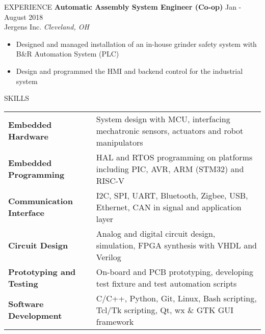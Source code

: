 \documentclass{lib/resume} %
\begin{document}
\begin{rSection}{EXPERIENCE}
    \textbf{Automatic Assembly System Engineer (Co-op)} \hfill Jan - August 2018
    \\	Jergens Inc. \hfill \textit{Cleveland, OH}
    \begin{itemize}
        \itemsep -4pt {}
        \item Designed and managed installation of an in-house grinder safety system with B\&R Automation System (PLC)
        \item Design and programmed the HMI and backend control for the industrial system
    \end{itemize}
\end{rSection}

\begin{rSection}{SKILLS}

    \begin{tabular}{ @{} >{\bfseries}l @{\hspace{2ex}} l }
        Embedded Hardware       & System design with MCU, interfacing mechatronic sensors, actuators and robot manipulators \\
        Embedded Programming    & HAL and RTOS programming on platforms including PIC, AVR, ARM (STM32) and RISC-V  \\
        Communication Interface & I2C, SPI, UART, Bluetooth, Zigbee, USB, Ethernet, CAN in signal and application layer \\
        Circuit Design          & Analog and digital circuit design, simulation, FPGA synthesis with VHDL and Verilog  \\
        Prototyping and Testing & On-board and PCB prototyping, developing test
        fixture and test automation scripts \\
        Software Development    & C/C++, Python, Git, Linux, Bash scripting, Tcl/Tk scripting, Qt, wx \& GTK GUI framework \\
    \end{tabular}
\end{rSection}
\end{document}
